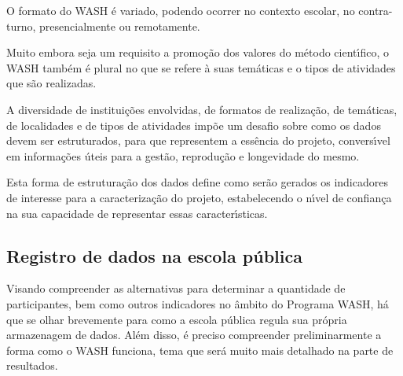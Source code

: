 \documentclass[
12pt,		%
openright,	%
twoside,  %
a4paper,			%
chapter=TITLE,		%
english,			%
french,				%
spanish,			%
brazil				%
]{USPSC-classe/USPSC}
\begin{document}
O formato do WASH \'e variado, podendo ocorrer no contexto escolar, no contra-turno, presencialmente ou remotamente.









Muito embora seja um requisito a promo\c{c}\~ao dos valores do m\'etodo cient\'{\i}fico, o WASH tamb\'em \'e plural no que se refere \`a suas tem\'aticas e o tipos de atividades que s\~ao realizadas.









A diversidade de institui\c{c}\~oes envolvidas, de formatos de realiza\c{c}\~ao, de tem\'aticas, de localidades e de tipos de atividades imp\~oe um desafio sobre como os dados devem ser estruturados, para que representem a ess\^encia do projeto, convers\'{\i}vel em informa\c{c}\~oes \'uteis para a gest\~ao, reprodu\c{c}\~ao e longevidade do mesmo.









Esta forma de estrutura\c{c}\~ao dos dados define como ser\~ao gerados os indicadores de interesse para a caracteriza\c{c}\~ao do projeto, estabelecendo o n\'{\i}vel de confian\c{c}a na sua capacidade de representar essas caracter\'{\i}sticas.









\subsection[Registro de dados na escola p\'ublica]{Registro de dados na escola p\'ublica}\label{Registro de dados na escola p\'ublica}
Visando compreender as alternativas para determinar a quantidade de participantes, bem como outros indicadores no \^ambito do Programa WASH, h\'a que se olhar brevemente para como a escola p\'ublica regula sua pr\'opria armazenagem de dados. Al\'em disso, \'e preciso compreender preliminarmente a forma como o WASH funciona, tema que ser\'a muito mais detalhado na parte de resultados.
\end{document}
